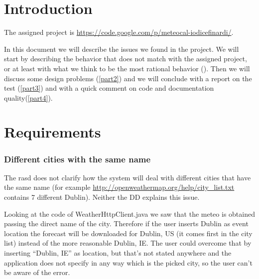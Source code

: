 \documentclass[10pt,a4paper,titlepage]{article}
\begin{document}


\tableofcontents

\pagebreak
\part{Introduction}
The assigned project is \url{https://code.google.com/p/meteocal-iodicefinardi/}.

In this document we will describe the issues we found in the project. We will start by describing the behavior that does not match with the assigned project, or at least with what we think to be the most rational behavior (\ref{part1}). Then we will discuss some design problems (\ref{part2}) and we will conclude with a report on the test (\ref{part3}) and with a quick comment on code and documentation quality(\ref{part4}).

\pagebreak
\part{Requirements}
\label{part1}
\section{Different cities with the same name}
The rasd does not clarify how the system will deal with different cities that have the same name (for example \url{http://openweathermap.org/help/city_list.txt} contains 7 different Dublin). Neither the DD explains this issue.

Looking at the code of WeatherHttpClient.java we saw that the meteo is obtained passing the direct name of the city. Therefore if the user inserts Dublin as event location the forecast will be downloaded for Dublin, US (it comes first in the city list) instead of the more reasonable Dublin, IE. The user could overcome that by inserting ``Dublin, IE'' as location, but that's not stated anywhere and the application does not specify in any way which is the picked city, so the user can't be aware of the error.
\end{document}
